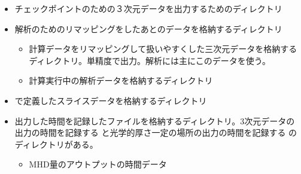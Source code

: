 \documentclass[letterpaper,10pt,dvipdfmx,report]{sphinxmanual}
\begin{document}
\begin{itemize}
\begin{description}
\begin{itemize}
\begin{description}
\end{description}

\item {} \begin{description}
\sphinxAtStartPar
チェックポイントのための３次元データを出力するためのディレクトリ

\end{description}

\item {} \begin{description}
\sphinxAtStartPar
解析のためのリマッピングをしたあとのデータを格納するディレクトリ
\begin{itemize}
\item {} \begin{description}
\sphinxAtStartPar
計算データをリマッピングして扱いやすくした三次元データを格納するディレクトリ。単精度で出力。解析には主にこのデータを使う。

\end{description}

\item {} \begin{description}
\sphinxAtStartPar
計算実行中の解析データを格納するディレクトリ

\end{description}

\end{itemize}

\end{description}

\item {} \begin{description}
\sphinxAtStartPar
{} で定義したスライスデータを格納するディレクトリ

\end{description}

\item {} \begin{description}
\sphinxAtStartPar
出力した時間を記録したファイルを格納するディレクトリ。3次元データの出力の時間を記録する  と光学的厚さ一定の場所の出力の時間を記録する  のディレクトリがある。
\begin{itemize}
\item {} \begin{description}
\sphinxAtStartPar
MHD量のアウトプットの時間データ


\end{description}
\end{itemize}
\end{description}
\end{itemize}
\end{description}
\end{itemize}
\end{document}
